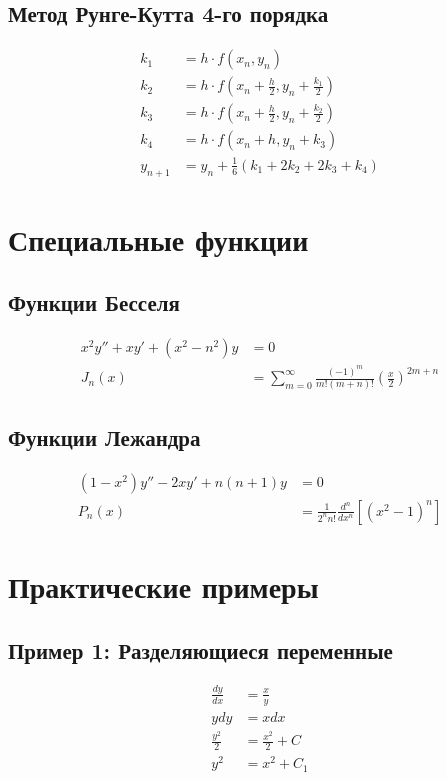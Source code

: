 \documentclass[10pt,landscape,a4paper]{article}
\begin{document}
\begin{multicols}{2}
\subsection{Метод Рунге-Кутта 4-го порядка}
\begin{align}
    k_1 &= h \cdot f(x_n, y_n) \\
    k_2 &= h \cdot f(x_n + \frac{h}{2}, y_n + \frac{k_1}{2}) \\
    k_3 &= h \cdot f(x_n + \frac{h}{2}, y_n + \frac{k_2}{2}) \\
    k_4 &= h \cdot f(x_n + h, y_n + k_3) \\
    y_{n+1} &= y_n + \frac{1}{6}(k_1 + 2k_2 + 2k_3 + k_4)
\end{align}

\section{Специальные функции}

\subsection{Функции Бесселя}
\begin{align}
    x^2y'' + xy' + (x^2 - n^2)y &= 0 \\
    J_n(x) &= \sum_{m=0}^{\infty} \frac{(-1)^m}{m!(m+n)!}\left(\frac{x}{2}\right)^{2m+n}
\end{align}

\subsection{Функции Лежандра}
\begin{align}
    (1-x^2)y'' - 2xy' + n(n+1)y &= 0 \\
    P_n(x) &= \frac{1}{2^n n!}\frac{d^n}{dx^n}[(x^2-1)^n]
\end{align}

\section{Практические примеры}

\subsection{Пример 1: Разделяющиеся переменные}
\begin{align}
    \frac{dy}{dx} &= \frac{x}{y} \\
    y dy &= x dx \\
    \frac{y^2}{2} &= \frac{x^2}{2} + C \\
    y^2 &= x^2 + C_1
\end{align}


\end{multicols}
\end{document}
